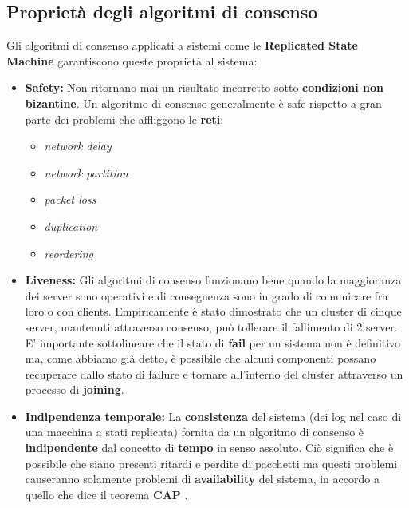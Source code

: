 		\subsection{Proprietà degli algoritmi di consenso}
    Gli algoritmi di consenso applicati a sistemi come le \textbf{Replicated State Machine} garantiscono queste proprietà al sistema:
    \begin{itemize}
       \item{\textbf{Safety:}}
       Non ritornano mai un risultato incorretto sotto \textbf{condizioni non bizantine}. Un algoritmo di consenso generalmente è safe rispetto a gran parte dei problemi che affliggono le \textbf{reti}:
        \begin{itemize}
          \item \textit{network delay}
          \item \textit{network partition} 
          \item \textit{packet loss}
          \item \textit{duplication}
          \item \textit{reordering}
        \end{itemize}
       \item{\textbf{Liveness:}}
       Gli algoritmi di consenso funzionano bene quando la maggioranza dei server sono operativi e di conseguenza sono in grado di comunicare fra loro o con clients. Empiricamente è stato dimostrato che un cluster di cinque server, mantenuti attraverso consenso, può tollerare il fallimento di 2 server.\\
       E' importante sottolineare che il stato di \textbf{fail} per un sistema non è definitivo ma, come abbiamo già detto, è possibile che alcuni componenti possano recuperare dallo stato di failure e tornare all'interno del cluster attraverso un processo di \textbf{joining}.
       \item{\textbf{Indipendenza temporale:}}
       La \textbf{consistenza} del sistema (dei log nel caso di una macchina a stati replicata) fornita da un algoritmo di consenso è \textbf{indipendente} dal concetto di \textbf{tempo} in senso assoluto. Ciò significa che è possibile che siano presenti ritardi e perdite di pacchetti ma questi problemi causeranno solamente problemi di \textbf{availability} del sistema, in accordo a quello che dice il teorema \textbf{CAP} \cite[Brewer:2000]{Brewer:2000}.
     \end{itemize} 

